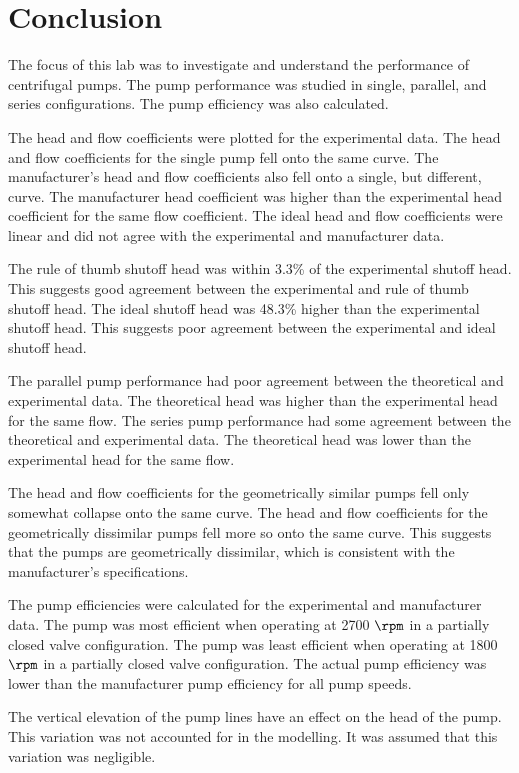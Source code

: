 \section{Conclusion}
The focus of this lab was to investigate and understand the performance of centrifugal pumps. The pump performance was studied in single, parallel, and series configurations. The pump efficiency was also calculated. 

The head and flow coefficients were plotted for the experimental data. The head and flow coefficients for the single pump fell onto the same curve. The manufacturer's head and flow coefficients also fell onto a single, but different, curve. The manufacturer head coefficient was higher than the experimental head coefficient for the same flow coefficient. The ideal head and flow coefficients were linear and did not agree with the experimental and manufacturer data.

The rule of thumb shutoff head was within 3.3\% of the experimental shutoff head. This suggests good agreement between the experimental and rule of thumb shutoff head. The ideal shutoff head was 48.3\% higher than the experimental shutoff head. This suggests poor agreement between the experimental and ideal shutoff head.

The parallel pump performance had poor agreement between the theoretical and experimental data. The theoretical head was higher than the experimental head for the same flow. The series pump performance had some agreement between the theoretical and experimental data. The theoretical head was lower than the experimental head for the same flow.

The head and flow coefficients for the geometrically similar pumps fell only somewhat collapse onto the same curve. The head and flow coefficients for the geometrically dissimilar pumps fell more so onto the same curve. This suggests that the pumps are geometrically dissimilar, which is consistent with the manufacturer's specifications.

The pump efficiencies were calculated for the experimental and manufacturer data. The pump was most efficient when operating at 2700 $\unit{\rpm}$ in a partially closed valve configuration. The pump was least efficient when operating at 1800 $\unit{\rpm}$ in a partially closed valve configuration. The actual pump efficiency was lower than the manufacturer pump efficiency for all pump speeds.

The vertical elevation of the pump lines have an effect on the head of the pump. This variation was not accounted for in the modelling. It was assumed that this variation was negligible.

